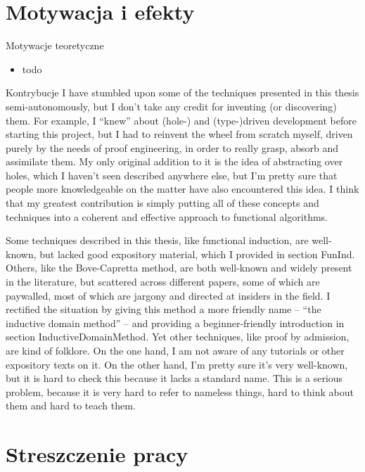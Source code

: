 \documentclass{beamer}
\begin{document}
\section{Motywacja i efekty}

\begin{frame}{Motywacje teoretyczne}
\begin{itemize}
	\item todo
\end{itemize}
\end{frame}

\begin{frame}{Kontrybucje}
	I have stumbled upon some of the techniques presented in this thesis semi-autonomously, but I don't take any credit for inventing (or discovering) them. For example, I ``knew'' about (hole-) and (type-)driven development before starting this project, but I had to reinvent the wheel from scratch myself, driven purely by the needs of proof engineering, in order to really grasp, absorb and assimilate them. My only original addition to it is the idea of abstracting over holes, which I haven't seen described anywhere else, but I'm pretty sure that people more knowledgeable on the matter have also encountered this idea. I think that my greatest contribution is simply putting all of these concepts and techniques into a coherent and effective approach to functional algorithms.

	Some techniques described in this thesis, like functional induction, are well-known, but lacked good expository material, which I provided in section FunInd. Others, like the Bove-Capretta method, are both well-known and widely present in the literature, but scattered across different papers, some of which are paywalled, most of which are jargony and directed at insiders in the field. I rectified the situation by giving this method a more friendly name -- ``the inductive domain method'' -- and providing a beginner-friendly introduction in section InductiveDomainMethod. Yet other techniques, like proof by admission, are kind of folklore. On the one hand, I am not aware of any tutorials or other expository texts on it. On the other hand, I'm pretty sure it's very well-known, but it is hard to check this because it lacks a standard name. This is a serious problem, because it is very hard to refer to nameless things, hard to think about them and hard to teach them.
\end{frame}

\section{Streszczenie pracy}
\end{document}
